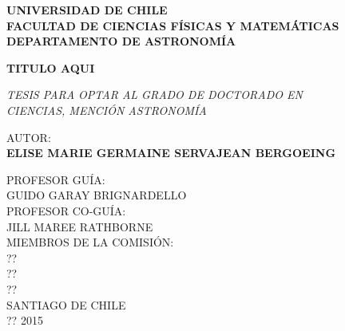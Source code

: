\documentclass[phd, titlesmallcaps, copyrightpage]{mqthesis}
\numberwithin{equation}{chapter}
\begin{document}
\vspace*{-18 ex}
\thispagestyle{empty}
\begin{minipage}[b]{0.1\linewidth}
\end{minipage}
\begin{minipage}[b]{0.9\linewidth}
{\bf \large \noindent UNIVERSIDAD DE CHILE \\
   FACULTAD DE CIENCIAS F\'ISICAS Y MATEM\'ATICAS \\
 DEPARTAMENTO  DE ASTRONOM\'IA }
\end{minipage}
\hfill
\vspace{4cm}

\begin{center}{\bf \Large TITULO AQUI}\end{center}

\vspace{1 ex} 

\begin{center}{\it  \large TESIS PARA OPTAR AL GRADO DE DOCTORADO EN \\
CIENCIAS, MENCI\'ON ASTRONOM\'IA} \end{center}

\vspace{1.5cm} 


\begin{center} {\large AUTOR: \\ {\bf ELISE MARIE GERMAINE SERVAJEAN BERGOEING}} \end{center}

\vspace{7 ex} 

\begin{center} { PROFESOR GU\'IA:\\
    GUIDO GARAY BRIGNARDELLO\\
    PROFESOR CO-GU\'IA:\\
    JILL MAREE RATHBORNE\\
    \vspace{0.3cm}
    MIEMBROS DE LA COMISI\'ON:\\
    ??\\
    ??\\
    ??\\
    \vspace{0.8cm}
    SANTIAGO DE CHILE\\
    ?? 2015 } \end{center}
\end{document}
